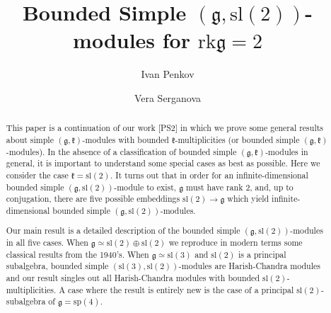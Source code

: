 \documentclass[12pt]{amsart}
\theoremstyle{plain} %
\newcommand{\rk}{\mathrm{rk }}
\renewcommand{\sl}{\mathrm{sl}}
\renewcommand{\sp}{\mathrm{sp}}
\renewcommand{\gg}{\mathfrak{g}}
\begin{document}


\ifx\useHugeSize\undefined
\else
\Huge
\fi

\relax

\title{ Bounded Simple $\left(\mathfrak g,\sl(2)\right)$-modules for $\rk \mathfrak g=2$}

\author{Ivan Penkov}
\address{
Jacobs University Bremen \\
School of Engineering and Science,
Campus Ring 1,
28759 Bremen, Germany}

\author{Vera Serganova}
\address{Department of Mathematics, University of California Berkeley, Berkeley
  CA 94720, USA}

\begin{abstract}
This paper is a continuation of our work [PS2] in which we prove some general results about simple $\left(\mathfrak g, \mathfrak k \right)$-modules with bounded $\mathfrak k$-multiplicities (or bounded simple $\left(\mathfrak g, \mathfrak k \right)$-modules). In the absence of a classification of bounded simple $\left(\mathfrak g, \mathfrak k \right)$-modules in general, it is important to understand some special cases as best as possible. Here we consider the case $\mathfrak k=\sl(2)$. It turns out that in order for an infinite-dimensional bounded simple $\left(\mathfrak g, \sl(2) \right)$-module to exist, $\mathfrak g$ must have rank 2, and, up to conjugation, there are five possible embeddings $\sl(2)\rightarrow \mathfrak g$ which yield infinite-dimensional bounded simple $\left(\mathfrak g, \sl(2) \right)$-modules.

Our main result is a detailed description of the bounded simple $\left(\mathfrak g, \sl(2)\right)$-modules in all five cases. When $\gg \simeq \sl(2)\oplus\sl(2)$ we reproduce in modern terms some classical results from the 1940's. When $\gg \simeq \sl(3)$ and $\sl(2)$ is a principal subalgebra, bounded simple $\left( \sl(3), \sl(2)\right)$-modules are Harish-Chandra modules and our result singles out all Harish-Chandra modules with bounded $\sl(2)$-multiplicities. A case where the result is entirely new is the case of a principal $\sl(2)$-subalgebra of $\gg=\sp(4)$. 


\end{abstract}
\maketitle
\end{document}
